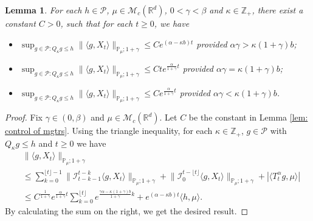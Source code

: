 \documentclass[12pt]{amsart}
\theoremstyle{plain}
\newtheorem{lem}[thm]{Lemma}
\theoremstyle{definition}
\numberwithin{equation}{section}
\begin{document}
\begin{lem}
\label{lem: control moment}
	For each $h \in \mathcal P$, $\mu \in \mathcal M_c(\mathbb{R}^d)$, $0<\gamma < \beta$ and $\kappa \in \mathbb Z_+$, there exist a constant $C > 0$, such that for each $t\geq 0$, we have
\begin{itemize}
\item[(1)]
    $\sup_{g\in \mathcal P: Q_\kappa g \leq h}\|\langle g,X_t\rangle\|_{\mathbb{P}_{\mu};1+\gamma}\leq C e^{(\alpha-\kappa b)t}$ provided $\alpha\gamma > \kappa (1+\gamma)b$;
\item[(2)]
    $\sup_{g\in \mathcal P: Q_\kappa g \leq h}\|\langle g,X_t\rangle\|_{\mathbb{P}_{\mu};1+\gamma}\leq C te^{\frac{\alpha}{1+\gamma}t}$ provided $\alpha\gamma = \kappa (1+\gamma)b$;
\item[(3)]
    $\sup_{g\in \mathcal P: Q_\kappa g \leq h} \|\langle g,X_t\rangle\|_{\mathbb{P}_{\mu};1+\gamma}\leq C e^{\frac{\alpha}{1+\gamma}t}$ provided $\alpha\gamma < \kappa (1+\gamma)b$.
\end{itemize}
\end{lem}
\begin{proof}
    Fix $\gamma \in (0,\beta)$ and $\mu \in \mathcal M_c(\mathbb R^d)$.
    Let $C$ be the constant in Lemma \ref{lem: control of mgtrs}.
    Using the triangle inequality, for each $\kappa\in \mathbb Z_+$, $g \in \mathcal P$ with $Q_\kappa g \leq h$ and $t\geq 0$ we have
\begin{align}
    &\|\langle g,X_t\rangle\|_{\mathbb P_\mu;1+\gamma}
    \\ &\leq \sum_{k=0}^{\lfloor t\rfloor - 1}\big\| \mathcal{I}_{t-k-1}^{t-k}\langle g,X_t\rangle \big\|_{\mathbb P_\mu;1+\gamma}+\big\| \mathcal{I}_{0}^{t-\lfloor t \rfloor}\langle g,X_t\rangle  \big\|_{\mathbb P_\mu;1+\gamma}
    + |\langle T^\alpha_t g,\mu\rangle|
    \\ &\leq C^{\frac{1}{1+\gamma}} e^{\frac{\alpha}{1+\gamma}t} \sum_{k=0}^{\lfloor t\rfloor} e^{\frac{\gamma\alpha-\kappa (1+\gamma)b}{1+\gamma} k} + e^{(\alpha - \kappa b)t} \langle h,\mu\rangle. 
\end{align}
    By calculating the sum on the right, we get the desired result.
\end{proof}
\end{document}
